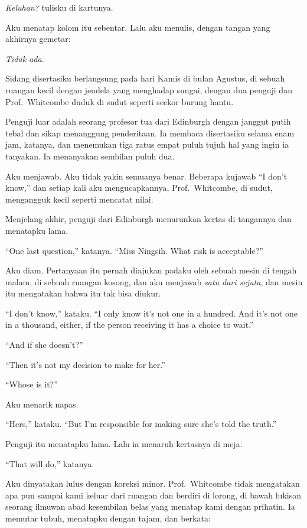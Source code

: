 \documentclass[11pt,twoside,openany]{book}
\makeatletter
\newcommand{\scenebreak}{\par\vspace{0.9em}{\centering\textsc{*\hspace{0.7em}*\hspace{0.7em}*}\par}\vspace{0.9em}\@afterindentfalse\@afterheading}
\makeatother
\begin{document}
\emph{Keluhan?} tulisku di kartunya.

Aku menatap kolom itu sebentar. Lalu aku menulis, dengan tangan yang akhirnya gemetar:

\emph{Tidak ada.}

\scenebreak
Sidang disertasiku berlangsung pada hari Kamis di bulan Agustus, di sebuah ruangan kecil dengan jendela yang menghadap sungai, dengan dua penguji dan Prof.~Whitcombe duduk di sudut seperti seekor burung hantu.

Penguji luar adalah seorang profesor tua dari Edinburgh dengan janggut putih tebal dan sikap menanggung penderitaan. Ia membaca disertasiku selama enam jam, katanya, dan menemukan tiga ratus empat puluh tujuh hal yang ingin ia tanyakan. Ia menanyakan sembilan puluh dua.

Aku menjawab. Aku tidak yakin semuanya benar. Beberapa kujawab ``I don't know,'' dan setiap kali aku mengucapkannya, Prof.~Whitcombe, di sudut, mengangguk kecil seperti mencatat nilai.

Menjelang akhir, penguji dari Edinburgh menurunkan kertas di tangannya dan menatapku lama.

``One last question,'' katanya. ``Miss Ningsih. What risk is acceptable?''

Aku diam. Pertanyaan itu pernah diajukan padaku oleh sebuah mesin di tengah malam, di sebuah ruangan kosong, dan aku menjawab \emph{satu dari sejuta}, dan mesin itu mengatakan bahwa itu tak bisa diukur.

``I don't know,'' kataku. ``I only know it's not one in a hundred. And it's not one in a thousand, either, if the person receiving it has a choice to wait.''

``And if she doesn't?''

``Then it's not my decision to make for her.''

``Whose is it?''

Aku menarik napas.

``Hers,'' kataku. ``But I'm responsible for making sure she's told the truth.''

Penguji itu menatapku lama. Lalu ia menaruh kertasnya di meja.

``That will do,'' katanya.

Aku dinyatakan lulus dengan koreksi minor. Prof.~Whitcombe tidak mengatakan apa pun sampai kami keluar dari ruangan dan berdiri di lorong, di bawah lukisan seorang ilmuwan abad kesembilan belas yang menatap kami dengan prihatin. Ia memutar tubuh, menatapku dengan tajam, dan berkata:
\end{document}
